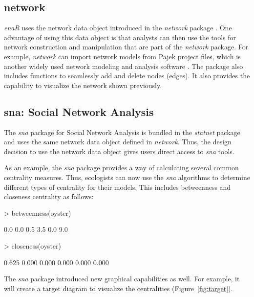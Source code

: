 \documentclass[article]{jss}
\begin{document}
\subsection{network}
\textit{enaR} uses the network data object introduced in the
\textit{network} package \citep{butts08_network}.  One advantage of
using this data object is that analysts can then use the tools for
network construction and manipulation that are part of the
\textit{network} package.  For example, \textit{network} can import
network models from Pajek project files, which is another widely used
network modeling and analysis software \citep{batajel07}.  The package
also includes functions to seamlessly add and delete nodes (edges).
It also provides the capability to visualize the network shown previously.

\subsection{sna: Social Network Analysis}
The \textit{sna} package for Social Network Analysis is bundled in the
\textit{statnet} package and uses the same network data object defined
in \textit{network}.  Thus, the design decision to use the network
data object gives users direct access to \textit{sna} tools.

As an example, the \textit{sna} package provides a way of calculating
several common centrality measures.  Thus, ecologists can now use the
\textit{sna} algorithms to determine different types of centrality for their
models.  This includes betweenness and closeness centrality as follows:

\begin{Schunk}
\begin{Sinput}
> betweenness(oyster)
\end{Sinput}
\begin{Soutput}
[1] 0.0 0.0 0.5 3.5 0.0 9.0
\end{Soutput}
\begin{Sinput}
> closeness(oyster)
\end{Sinput}
\begin{Soutput}
[1] 0.625 0.000 0.000 0.000 0.000 0.000
\end{Soutput}
\end{Schunk}

The \textit{sna} package introduced new graphical capabilities as
well. For example, it will create a target diagram to visualize the
centralities (Figure~\ref{fig:target}).
\end{document}
